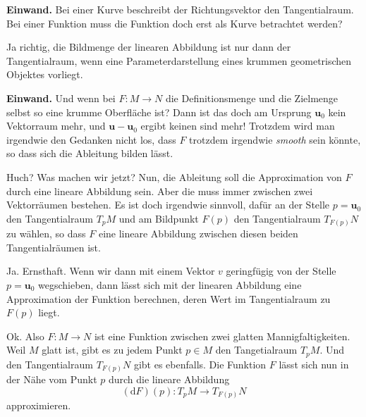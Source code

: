 \documentclass{beamer}
\begin{document}
\begin{frame}
\textbf{Einwand.} Bei einer Kurve beschreibt der Richtungsvektor
den Tangentialraum. Bei einer Funktion muss die Funktion doch
erst als Kurve betrachtet werden?
\end{frame}

\begin{frame}
Ja richtig, die Bildmenge der linearen Abbildung ist nur dann
der Tangentialraum, wenn eine Parameterdarstellung eines krummen
geometrischen Objektes vorliegt.
\end{frame}

\begin{frame}
\textbf{Einwand.}
Und wenn bei $F\colon M\to N$ die Definitionsmenge und die Zielmenge
selbst so eine krumme Oberfläche ist? Dann ist das doch am Ursprung
$\mathbf u_0$ kein Vektorraum mehr, und $\mathbf u-\mathbf u_0$ ergibt
keinen sind mehr! Trotzdem wird man irgendwie den Gedanken nicht los,
dass $F$ trotzdem irgendwie \emph{smooth} sein könnte, so dass sich
die Ableitung bilden lässt.
\end{frame}

\begin{frame}
Huch? Was machen wir jetzt? Nun, die Ableitung soll die Approximation
von $F$ durch eine lineare Abbildung sein. Aber die muss immer
zwischen zwei Vektorräumen bestehen. Es ist doch irgendwie sinnvoll,
dafür an der Stelle $p=\mathbf u_0$ den Tangentialraum $T_p M$ und
am Bildpunkt $F(p)$ den Tangentialraum $T_{F(p)}N$ zu wählen,
so dass $F$ eine lineare Abbildung zwischen diesen beiden
Tangentialräumen ist.
\end{frame}

\begin{frame}
Ja. Ernsthaft. Wenn wir dann mit einem Vektor $v$ geringfügig von
der Stelle $p=\mathbf u_0$ wegschieben, dann lässt sich mit
der linearen Abbildung eine Approximation der Funktion berechnen,
deren Wert im Tangentialraum zu $F(p)$ liegt.
\end{frame}

\begin{frame}
Ok. Also $F\colon M\to N$ ist eine Funktion zwischen zwei
glatten Mannigfaltigkeiten. Weil $M$ glatt ist, gibt es zu jedem
Punkt $p\in M$ den Tangetialraum $T_p M$. Und den Tangentialraum
$T_{F(p)}N$ gibt es ebenfalls. Die Funktion $F$ lässt sich nun
in der Nähe vom Punkt $p$ durch die lineare Abbildung
\[(\mathrm dF)(p)\colon T_pM\to T_{F(p)}N\]
approximieren.
\end{frame}
\end{document}
